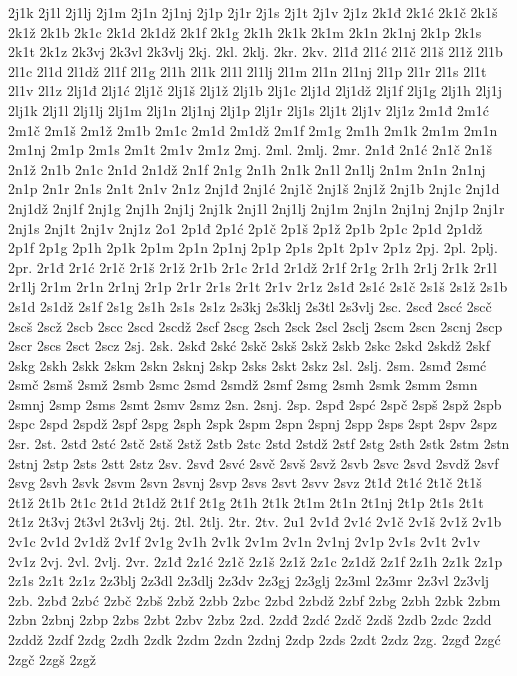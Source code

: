 {2j1k
2j1l
2j1lj
2j1m
2j1n
2j1nj
2j1p
2j1r
2j1s
2j1t
2j1v
2j1z
2k1đ
2k1ć
2k1č
2k1š
2k1ž
2k1b
2k1c
2k1d
2k1dž
2k1f
2k1g
2k1h
2k1k
2k1m
2k1n
2k1nj
2k1p
2k1s
2k1t
2k1z
2k3vj
2k3vl
2k3vlj
2kj.
2kl.
2klj.
2kr.
2kv.
2l1đ
2l1ć
2l1č
2l1š
2l1ž
2l1b
2l1c
2l1d
2l1dž
2l1f
2l1g
2l1h
2l1k
2l1l
2l1lj
2l1m
2l1n
2l1nj
2l1p
2l1r
2l1s
2l1t
2l1v
2l1z
2lj1đ
2lj1ć
2lj1č
2lj1š
2lj1ž
2lj1b
2lj1c
2lj1d
2lj1dž
2lj1f
2lj1g
2lj1h
2lj1j
2lj1k
2lj1l
2lj1lj
2lj1m
2lj1n
2lj1nj
2lj1p
2lj1r
2lj1s
2lj1t
2lj1v
2lj1z
2m1đ
2m1ć
2m1č
2m1š
2m1ž
2m1b
2m1c
2m1d
2m1dž
2m1f
2m1g
2m1h
2m1k
2m1m
2m1n
2m1nj
2m1p
2m1s
2m1t
2m1v
2m1z
2mj.
2ml.
2mlj.
2mr.
2n1đ
2n1ć
2n1č
2n1š
2n1ž
2n1b
2n1c
2n1d
2n1dž
2n1f
2n1g
2n1h
2n1k
2n1l
2n1lj
2n1m
2n1n
2n1nj
2n1p
2n1r
2n1s
2n1t
2n1v
2n1z
2nj1đ
2nj1ć
2nj1č
2nj1š
2nj1ž
2nj1b
2nj1c
2nj1d
2nj1dž
2nj1f
2nj1g
2nj1h
2nj1j
2nj1k
2nj1l
2nj1lj
2nj1m
2nj1n
2nj1nj
2nj1p
2nj1r
2nj1s
2nj1t
2nj1v
2nj1z
2o1
2p1đ
2p1ć
2p1č
2p1š
2p1ž
2p1b
2p1c
2p1d
2p1dž
2p1f
2p1g
2p1h
2p1k
2p1m
2p1n
2p1nj
2p1p
2p1s
2p1t
2p1v
2p1z
2pj.
2pl.
2plj.
2pr.
2r1đ
2r1ć
2r1č
2r1š
2r1ž
2r1b
2r1c
2r1d
2r1dž
2r1f
2r1g
2r1h
2r1j
2r1k
2r1l
2r1lj
2r1m
2r1n
2r1nj
2r1p
2r1r
2r1s
2r1t
2r1v
2r1z
2s1đ
2s1ć
2s1č
2s1š
2s1ž
2s1b
2s1d
2s1dž
2s1f
2s1g
2s1h
2s1s
2s1z
2s3kj
2s3klj
2s3tl
2s3vlj
2sc.
2scđ
2scć
2scč
2scš
2scž
2scb
2scc
2scd
2scdž
2scf
2scg
2sch
2sck
2scl
2sclj
2scm
2scn
2scnj
2scp
2scr
2scs
2sct
2scz
2sj.
2sk.
2skđ
2skć
2skč
2skš
2skž
2skb
2skc
2skd
2skdž
2skf
2skg
2skh
2skk
2skm
2skn
2sknj
2skp
2sks
2skt
2skz
2sl.
2slj.
2sm.
2smđ
2smć
2smč
2smš
2smž
2smb
2smc
2smd
2smdž
2smf
2smg
2smh
2smk
2smm
2smn
2smnj
2smp
2sms
2smt
2smv
2smz
2sn.
2snj.
2sp.
2spđ
2spć
2spč
2spš
2spž
2spb
2spc
2spd
2spdž
2spf
2spg
2sph
2spk
2spm
2spn
2spnj
2spp
2sps
2spt
2spv
2spz
2sr.
2st.
2stđ
2stć
2stč
2stš
2stž
2stb
2stc
2std
2stdž
2stf
2stg
2sth
2stk
2stm
2stn
2stnj
2stp
2sts
2stt
2stz
2sv.
2svđ
2svć
2svč
2svš
2svž
2svb
2svc
2svd
2svdž
2svf
2svg
2svh
2svk
2svm
2svn
2svnj
2svp
2svs
2svt
2svv
2svz
2t1đ
2t1ć
2t1č
2t1š
2t1ž
2t1b
2t1c
2t1d
2t1dž
2t1f
2t1g
2t1h
2t1k
2t1m
2t1n
2t1nj
2t1p
2t1s
2t1t
2t1z
2t3vj
2t3vl
2t3vlj
2tj.
2tl.
2tlj.
2tr.
2tv.
2u1
2v1đ
2v1ć
2v1č
2v1š
2v1ž
2v1b
2v1c
2v1d
2v1dž
2v1f
2v1g
2v1h
2v1k
2v1m
2v1n
2v1nj
2v1p
2v1s
2v1t
2v1v
2v1z
2vj.
2vl.
2vlj.
2vr.
2z1đ
2z1ć
2z1č
2z1š
2z1ž
2z1c
2z1dž
2z1f
2z1h
2z1k
2z1p
2z1s
2z1t
2z1z
2z3blj
2z3dl
2z3dlj
2z3dv
2z3gj
2z3glj
2z3ml
2z3mr
2z3vl
2z3vlj
2zb.
2zbđ
2zbć
2zbč
2zbš
2zbž
2zbb
2zbc
2zbd
2zbdž
2zbf
2zbg
2zbh
2zbk
2zbm
2zbn
2zbnj
2zbp
2zbs
2zbt
2zbv
2zbz
2zd.
2zdđ
2zdć
2zdč
2zdš
2zdb
2zdc
2zdd
2zddž
2zdf
2zdg
2zdh
2zdk
2zdm
2zdn
2zdnj
2zdp
2zds
2zdt
2zdz
2zg.
2zgđ
2zgć
2zgč
2zgš
2zgž
}
